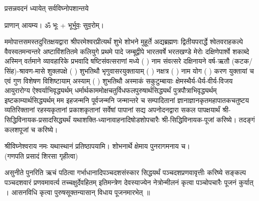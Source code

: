 
\setlength{\parindent}{0pt}




{प्रसन्नवदनं ध्यायेत् सर्वविघ्नोपशान्तये}

प्राणान्  आयम्य।  ॐ भूः + भूर्भुवः॒ सुव॒रोम्।


ममोपात्तसमस्तदुरितक्षयद्वारा श्रीपरमेश्वरप्रीत्यर्थं शुभे शोभने मुहूर्ते अद्यब्रह्मणः
द्वितीयपरार्द्धे श्वेतवराहकल्पे वैवस्वतमन्वन्तरे अष्टाविंशतितमे कलियुगे प्रथमे पादे
जम्बूद्वीपे भारतवर्षे भरतखण्डे मेरोः दक्षिणेपार्श्वे शकाब्दे अस्मिन् वर्तमाने व्यावहारिके
प्रभवादि षष्टिसंवत्सराणां मध्ये (  ) नाम संवत्सरे दक्षिनायने 
वर्ष-ऋतौ (कटक/सिंह)-श्रावण-मासे शुक्लपक्षे ( ) शुभतिथौ भृगुवासरयुक्तायाम्
(  ) नक्षत्र (  ) नाम  योग  ( ) करण युक्तायां च एवं गुण विशेषण विशिष्टायाम्
अस्याम् ( ) शुभतिथौ 
अस्माकं सकुटुम्बायाः क्षेमस्थैर्य-धैर्य-वीर्य-विजय आयुरारोग्य ऐश्वर्याभिवृद्ध्यर्थम्
धर्मार्थकाममोक्ष\-चतुर्विधफलपुरुषार्थसिद्ध्यर्थं पुत्रपौत्राभि\-वृद्ध्यर्थम् इष्टकाम्यार्थसिद्ध्यर्थम्
मम इहजन्मनि पूर्वजन्मनि जन्मान्तरे च सम्पादितानां ज्ञानाज्ञानकृतमहा\-पातकचतुष्टय
व्यतिरिक्तानां रहस्यकृतानां प्रकाशकृतानां सर्वेषां पापानां सद्य अपनोदनद्वारा सकल 
पापक्षयार्थं श्री-सिद्धिविनायक-प्रसादसिद्ध्यर्थं 
यथाशक्ति-ध्यानावाहनादिषोडशोपचारैः श्री-सिद्धिविनायक-पूजां करिष्ये। तदङ्गं कलशपूजां च करिष्ये। 

श्रीविघ्नेश्वराय नमः यथास्थानं प्रतिष्ठापयामि। शोभनार्थे क्षेमाय पुनरागमनाय च।\\
(गणपति प्रसादं शिरसा गृहीत्वा)














असुनीते पुनरिति ऋचं पठित्वा गर्भाधानादिपञ्चदशसंस्कार सिद्धयर्थं पञ्चदशप्रणवावृत्तीः करिष्ये सङ्कल्प पञ्चदशवारं प्रणवमावर्त्य तच्चक्षुर्देवहितम् इतिमन्त्रेण देवस्याज्येन नेत्रोन्मीलनं कृत्वा पञ्चोपचारैः पूजनं कुर्यात् । आसनविधि कृत्वा पुरुषसूक्तन्यासान् विधाय पूजनमारभेत् ॥ 

